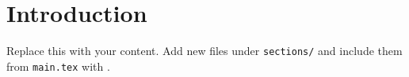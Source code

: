 \section{Introduction}
Replace this with your content. Add new files under \texttt{sections/}
and include them from \texttt{main.tex} with \verb||.
